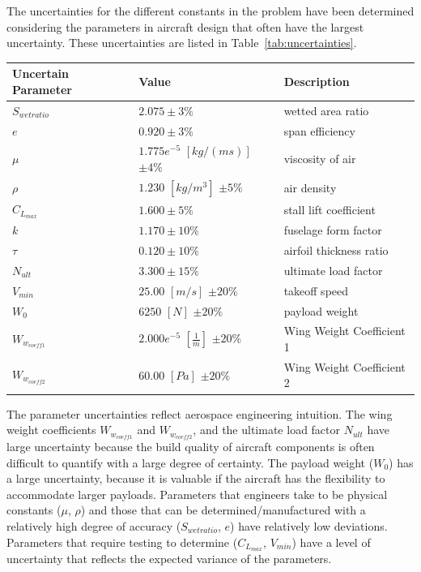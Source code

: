 The uncertainties for the different constants in the problem have been determined
considering the parameters in aircraft design that often have the largest uncertainty.
These uncertainties are listed in Table~\ref{tab:uncertainties}.

\begin{center}
\begin{tabular}{ |m{11em}|m{5cm}|m{5cm}|}
\hline
Uncertain Parameter & Value & Description \\
\hline
$S_{wetratio}$ & $2.075 \pm 3\%$ & wetted area ratio\\
\hline
$e$ & $0.920 \pm 3\%$ & span efficiency \\
\hline
$\mu$ & $1.775e^{-5}$ $[kg/(ms)]$ $\pm 4\%$ & viscosity of air\\
\hline
$\rho$ & $1.230$ $[kg/m^3]$ $\pm 5\%$  & air density\\  
\hline
$C_{L_{max}}$ & $1.600 \pm 5\%$ & stall lift coefficient\\
\hline
$k$ & $1.170 \pm 10\%$ & fuselage form factor\\
\hline
$\tau$ & $0.120 \pm 10\%$ & airfoil thickness ratio\\
\hline
$N_{ult}$ & $3.300 \pm 15\%$ & ultimate load factor\\
\hline
$V_{min}$ & $25.00$ $[m/s]$ $\pm 20\%$ & takeoff speed\\
\hline
$W_0$ & $6250$ $[N]$ $\pm 20\%$ & payload weight\\
\hline
$W_{w_{coeff1}}$ & $2.000e^{-5} $ $[\frac{1}{m}]$ $\pm 20\%$ & Wing Weight Coefficient 1\\
\hline
$W_{w_{coeff2}}$ & $60.00 $ $[Pa]$ $\pm 20\%$ & Wing Weight Coefficient 2\\  
\hline
\end{tabular}
\label{tab:uncertainties}
\end{center}

The parameter uncertainties reflect aerospace engineering intuition.
The wing weight coefficients $W_{w_{coeff1}}$ and $W_{w_{coeff2}}$, and the ultimate load factor $N_{ult}$ have
large uncertainty because the build quality of aircraft components is often difficult to quantify with a large degree of certainty.
The payload weight ($W_0$) has a large uncertainty, because it is valuable if the aircraft
has the flexibility to accommodate larger payloads. Parameters that engineers take to be
physical constants ($\mu$, $\rho$) and those that can be determined/manufactured with a relatively
high degree of accuracy ($S_{wetratio}$, $e$) have relatively low deviations.
Parameters that require testing to determine ($C_{L_{max}}$, $V_{min}$) have a level of uncertainty
that reflects the expected variance of the parameters.

